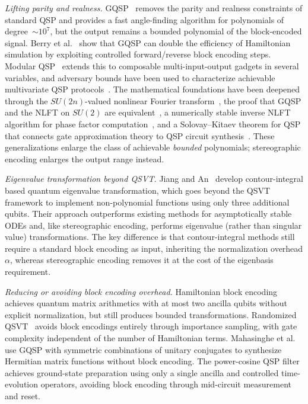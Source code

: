 \emph{Lifting parity and realness.}
GQSP~\cite{MotlaghWiebe2023} removes the parity and realness
constraints of standard QSP and provides a fast angle-finding
algorithm for polynomials of degree~$\sim 10^7$, but the output
remains a bounded polynomial of the block-encoded signal.
Berry et al.~\cite{BerryMotlaghPantaleoniWiebe2024} show that
GQSP can double the efficiency of Hamiltonian simulation by
exploiting controlled forward/reverse block encoding steps.
Modular QSP~\cite{RossiCeroniChuang2025} extends this to
composable multi-input-output gadgets in several variables, and
adversary bounds have been used to characterize achievable
multivariate QSP protocols~\cite{Laneve2025}.  The mathematical
foundations have been deepened through the $SU(2n)$-valued
nonlinear Fourier transform~\cite{AlexisBeckerEtAl2026},
the proof that GQSP and the NLFT on $SU(2)$ are
equivalent~\cite{Laneve2025b}, a numerically stable
inverse NLFT algorithm for phase factor
computation~\cite{NiSarkarYingLin2025}, and a Solovay--Kitaev
theorem for QSP that connects gate approximation theory to
QSP circuit synthesis~\cite{Rossi2025}.
These generalizations enlarge the class of achievable
\emph{bounded} polynomials; stereographic encoding enlarges the
output range instead.

\emph{Eigenvalue transformation beyond QSVT.}
Jiang and An~\cite{JiangAn2026} develop contour-integral based
quantum eigenvalue transformation, which goes beyond the QSVT
framework to implement non-polynomial functions using only three
additional qubits.  Their approach outperforms existing methods
for asymptotically stable ODEs and, like stereographic encoding,
performs eigenvalue (rather than singular value) transformations.
The key difference is that contour-integral methods still require
a standard block encoding as input, inheriting the normalization
overhead $\alpha$, whereas stereographic encoding removes it at
the cost of the eigenbasis requirement.

\emph{Reducing or avoiding block encoding overhead.}
Hamiltonian block encoding~\cite{KangSu2025} achieves quantum
matrix arithmetics with at most two ancilla qubits without
explicit normalization, but still produces bounded
transformations.  Randomized QSVT~\cite{WangZhangHazraEtAl2025}
avoids block encodings entirely through importance sampling, with
gate complexity independent of the number of Hamiltonian terms.
Mahasinghe et al.~\cite{MahasingheEtAl2025} use GQSP with
symmetric combinations of unitary conjugates to synthesize
Hermitian matrix functions without block encoding.  The
power-cosine QSP filter~\cite{Jo2026} achieves ground-state
preparation using only a single ancilla and controlled
time-evolution operators, avoiding block encoding through
mid-circuit measurement and reset.

